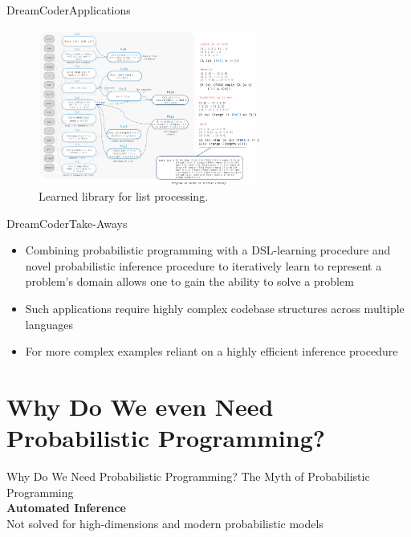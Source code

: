 \documentclass[AERbeamer%
              ,optEnglish%
              ,optBiber%
              ,optBibstyleAlphabetic%
              ,optBeamerClassicFormat%
              ]{AERlatex}%
\begin{document}
\begin{frame}[c]{DreamCoder}{Applications}
    \centering
    \begin{figure}
        \centering
        \includegraphics[width=0.65\textwidth]{DreamCoderApplication4.png}
        \caption{Learned library for list processing.}
    \end{figure}
\end{frame}


\begin{frame}[c]{DreamCoder}{Take-Aways}
    \centering
    \begin{itemize}
        \item Combining probabilistic programming with a DSL-learning procedure and novel probabilistic inference procedure
              to iteratively learn to represent a problem's domain allows one to gain the ability to solve a problem
        \item Such applications require highly complex codebase structures across multiple languages
        \item For more complex examples reliant on a highly efficient inference procedure
    \end{itemize}
\end{frame}




\section{Why Do We even Need Probabilistic Programming?}


\begin{frame}[c]{Why Do We Need Probabilistic Programming?}
    \centering
    \LARGE{The Myth of Probabilistic Programming \\ \textbf{Automated Inference} \\ Not solved for high-dimensions and modern probabilistic models}
\end{frame}
\end{document}
